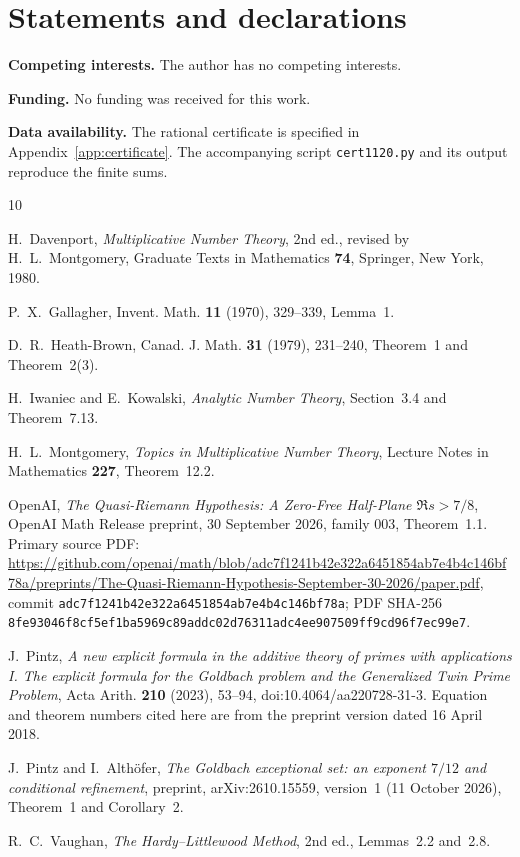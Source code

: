 \documentclass{amsart}
\numberwithin{equation}{section}
\numberwithin{table}{section}
\begin{document}
\section*{Statements and declarations}

\textbf{Competing interests.} The author has no competing interests.

\textbf{Funding.} No funding was received for this work.

\textbf{Data availability.} The rational certificate is specified in
Appendix~\ref{app:certificate}. The accompanying script
\texttt{cert1120.py} and its output reproduce the finite sums.

\begin{thebibliography}{10}

H.~Davenport, \emph{Multiplicative Number Theory}, 2nd ed.,
revised by H.~L.~Montgomery, Graduate Texts in Mathematics \textbf{74},
Springer, New York, 1980.

P.~X.~Gallagher, Invent. Math. \textbf{11} (1970), 329--339, Lemma~1.

D.~R.~Heath-Brown, Canad. J. Math. \textbf{31} (1979), 231--240,
Theorem~1 and Theorem~2(3).

H.~Iwaniec and E.~Kowalski, \emph{Analytic Number Theory},
Section~3.4 and Theorem~7.13.

H.~L.~Montgomery, \emph{Topics in Multiplicative Number Theory},
Lecture Notes in Mathematics \textbf{227}, Theorem~12.2.

OpenAI, \emph{The Quasi-Riemann Hypothesis: A Zero-Free Half-Plane
$\Re s>7/8$}, OpenAI Math Release preprint, 30 September 2026,
family 003, Theorem~1.1.
Primary source PDF: \url{https://github.com/openai/math/blob/adc7f1241b42e322a6451854ab7e4b4c146bf78a/preprints/The-Quasi-Riemann-Hypothesis-September-30-2026/paper.pdf},\newline
commit \texttt{adc7f1241b42e322a6451854ab7e4b4c146bf78a};\newline
PDF SHA-256 \texttt{8fe93046f8cf5ef1ba5969c89addc02d76311adc4ee907509ff9cd96f7ec99e7}.

J.~Pintz, \emph{A new explicit formula in the additive theory of primes
with applications I. The explicit formula for the Goldbach problem and the
Generalized Twin Prime Problem}, Acta Arith. \textbf{210} (2023), 53--94,
doi:10.4064/aa220728-31-3.
Equation and theorem numbers cited here are from the preprint version dated
16 April 2018.

J.~Pintz and I.~Alth\"ofer, \emph{The Goldbach exceptional set: an exponent
$7/12$ and conditional refinement}, preprint, arXiv:2610.15559, version~1
(11 October 2026),
Theorem~1 and Corollary~2.

R.~C.~Vaughan, \emph{The Hardy--Littlewood Method}, 2nd ed.,
Lemmas~2.2 and~2.8.

\end{thebibliography}
\end{document}
